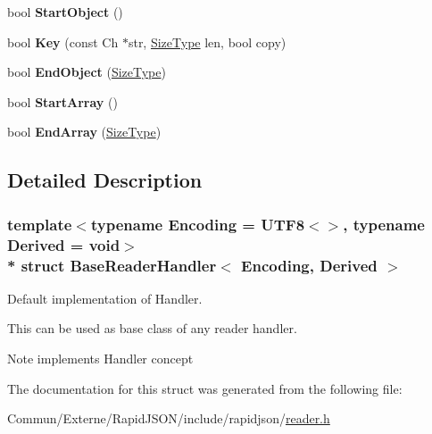 \begin{DoxyCompactItemize}
\item 
bool {\bfseries Start\+Object} ()\hypertarget{struct_base_reader_handler_ab0a7d9bcececb8d6ed748656f67f4917}{}\label{struct_base_reader_handler_ab0a7d9bcececb8d6ed748656f67f4917}

\item 
bool {\bfseries Key} (const Ch $\ast$str, \hyperlink{rapidjson_8h_a5ed6e6e67250fadbd041127e6386dcb5}{Size\+Type} len, bool copy)\hypertarget{struct_base_reader_handler_abc50b2e7e411b7b731715e05cd01e2eb}{}\label{struct_base_reader_handler_abc50b2e7e411b7b731715e05cd01e2eb}

\item 
bool {\bfseries End\+Object} (\hyperlink{rapidjson_8h_a5ed6e6e67250fadbd041127e6386dcb5}{Size\+Type})\hypertarget{struct_base_reader_handler_a0406cee0af26bc3a0b7fb2414537b0ab}{}\label{struct_base_reader_handler_a0406cee0af26bc3a0b7fb2414537b0ab}

\item 
bool {\bfseries Start\+Array} ()\hypertarget{struct_base_reader_handler_a9dbb1143a250a904bb18a174553a3a00}{}\label{struct_base_reader_handler_a9dbb1143a250a904bb18a174553a3a00}

\item 
bool {\bfseries End\+Array} (\hyperlink{rapidjson_8h_a5ed6e6e67250fadbd041127e6386dcb5}{Size\+Type})\hypertarget{struct_base_reader_handler_ae9d60a8779b6a77a7f283d64961879fb}{}\label{struct_base_reader_handler_ae9d60a8779b6a77a7f283d64961879fb}

\end{DoxyCompactItemize}


\subsection{Detailed Description}
\subsubsection*{template$<$typename Encoding = U\+T\+F8$<$$>$, typename Derived = void$>$\\*
struct Base\+Reader\+Handler$<$ Encoding, Derived $>$}

Default implementation of Handler. 

This can be used as base class of any reader handler. \begin{DoxyNote}{Note}
implements Handler concept 
\end{DoxyNote}


The documentation for this struct was generated from the following file\+:\begin{DoxyCompactItemize}
\item 
Commun/\+Externe/\+Rapid\+J\+S\+O\+N/include/rapidjson/\hyperlink{reader_8h}{reader.\+h}\end{DoxyCompactItemize}
